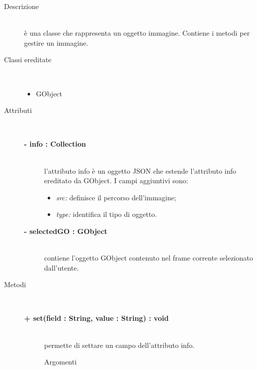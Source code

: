 \begin{description}
\item[Descrizione] \hfill \\
	è una classe che rappresenta un oggetto immagine. Contiene i metodi per gestire un immagine.
	
\item[Classi ereditate] \hfill \\
	\begin{itemize}
		\item GObject
	\end{itemize}
	
\item[Attributi] \hfill \\
	\begin{description}
		\item[\textbf{- info : Collection			}] \hfill \\
			l'attributo info è un oggetto JSON che estende l'attributo info ereditato da GObject. I campi aggiuntivi sono:
	\begin{itemize}
		\item \textit{src:} definisce il percorso dell'immagine;
		\item \textit{type:} identifica il tipo di oggetto.		
	\end{itemize}
	\end{description}
	\begin{description}
		\item[\textbf{- selectedGO : GObject			}] \hfill \\
			contiene l'oggetto GObject contenuto nel frame corrente selezionato dall'utente.  
	\end{description}	
	
\item[Metodi] \hfill \\

		\begin{description}
		\item[\textbf{\color{blue}+ set(field : String, value : String) : void			}] \hfill \\
			permette di settare un campo dell'attributo info.
			
		\begin{description}
			\item[Argomenti] \hfill \\
				\begin{itemize}
				

\end{itemize}
\end{description}
\end{description}
\end{description}
